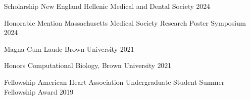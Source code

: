 


\begin{cvhonors}

  \cvhonor
    {Scholarship} %
    {New England Hellenic Medical and Dental Society} %
    {2024} %


  \cvhonor
    {Honorable Mention} %
    {Massachusetts Medical Society Research Poster Symposium} %
    {2024} %

  \cvhonor
    {Magna Cum Laude} %
    {Brown University} %
    {2021} %

  \cvhonor
    {Honors} %
    {Computational Biology, Brown University} %
    {2021} %

  \cvhonor
    {Fellowship} %
    {American Heart Association Undergraduate Student Summer Fellowship Award} %
    {2019} %

\end{cvhonors}




